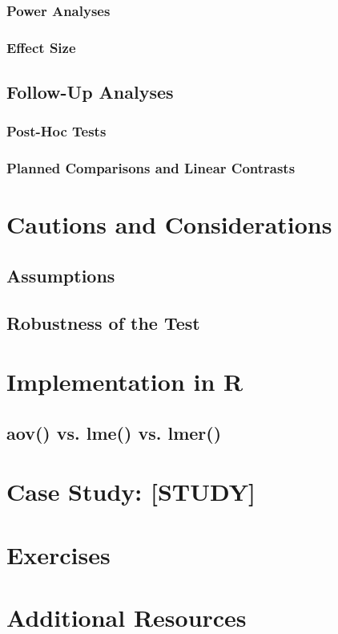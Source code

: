\subsubsection{Power Analyses}

\subsubsection{Effect Size}

\subsection{Follow-Up Analyses}

\subsubsection{Post-Hoc Tests}

\subsubsection{Planned Comparisons and Linear Contrasts}

\section{Cautions and Considerations}

\subsection{Assumptions}

\subsection{Robustness of the Test}

\section{Implementation in R}

\subsection{aov() vs. lme() vs. lmer()}

\section{Case Study: [STUDY]}

\section{Exercises}

\section{Additional Resources}

